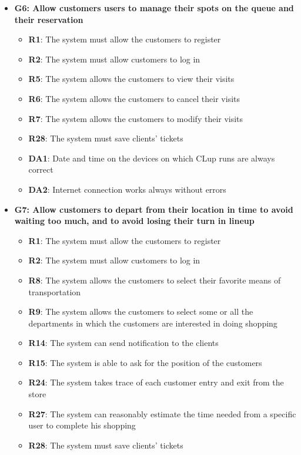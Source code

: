 \documentclass{article}
\begin{document}
\begin{itemize}
				\item {\bfseries G6: Allow customers users to manage their spots on the queue and their reservation}	

					\begin{itemize}
						\item {\bfseries R1}: The system must allow the customers to register
						\item {\bfseries R2}: The system must allow customers to log in
						\item {\bfseries R5}: The system allows the customers to view their visits
						\item {\bfseries R6}: The system allows the customers to cancel their visits
						\item {\bfseries R7}: The system allows the customers to modify their visits
						\item {\bfseries R28}: The system must save clients’ tickets \\
		
						\item {\bfseries DA1}: Date and time on the devices on which CLup runs are always correct
						\item {\bfseries DA2}: Internet connection works always without errors
							
					\end{itemize}

				\newpage 
				
				\item {\bfseries G7: Allow customers to depart from their location in time to avoid waiting too much, and to avoid losing their turn in lineup}	

					\begin{itemize}
						\item {\bfseries R1}: The system must allow the customers to register
						\item {\bfseries R2}: The system must allow customers to log in
						\item {\bfseries R8}: The system allows the customers to select their favorite means of transportation
						\item {\bfseries R9}: The system allows the customers to select some or all the departments in which the customers are interested in doing shopping
						\item {\bfseries R14}: The system can send notification to the clients
						\item {\bfseries R15}: The system is able to ask for the position of the customers
						\item {\bfseries R24}: The system takes trace of each customer entry and exit from the store
						\item {\bfseries R27}: The system can reasonably estimate the time needed from a specific user to complete his shopping
						\item {\bfseries R28}: The system must save clients’ tickets \\
					

\end{itemize}
\end{itemize}
\end{document}
